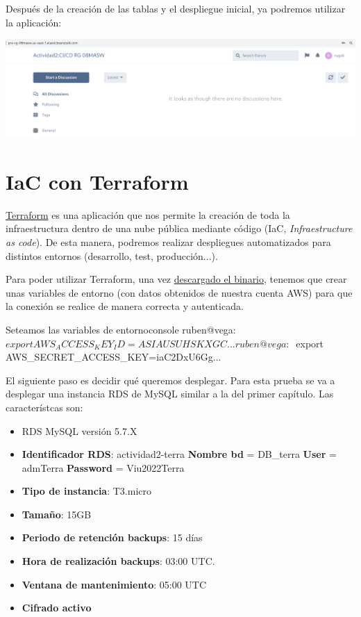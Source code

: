 \documentclass{\ClassPath/viu-tfm-template}
\begin{document}
Después de la creación de las tablas y el despliegue inicial, ya podremos utilizar la aplicación:
\begin{center}
    \includegraphics[frame,width=\linewidth]{img/flarum-3.png}
\end{center}

\chapter{IaC con Terraform}
\href{https://www.terraform.io/}{Terraform} es una aplicación que nos permite  la creación de toda la infraestructura dentro de una nube pública mediante código (IaC, \textit{Infraestructure as code}). De esta manera, podremos realizar despliegues automatizados para distintos entornos (desarrollo, test, producción...).

Para poder utilizar Terraform, una vez \href{https://developer.hashicorp.com/terraform/downloads}{descargado el binario}, tenemos que crear unas variables de entorno (con datos obtenidos de nuestra cuenta AWS) para que la conexión se realice de manera correcta y autenticada.

\begin{mycode}{Seteamos las variables de entorno}{console}{}
ruben@vega:~$ export AWS_ACCESS_KEY_ID=ASIAUSUHSKXGC...
ruben@vega:~$ export AWS_SECRET_ACCESS_KEY=iaC2DxU6Gg...
\end{mycode}

El siguiente paso es decidir qué queremos desplegar. Para esta prueba se va a desplegar una instancia RDS de MySQL similar a la del primer capítulo. Las característcas son:

\begin{itemize}
    \item RDS MySQL versión 5.7.X
    \item \textbf{Identificador RDS}: actividad2-terra
    \textbf{Nombre bd} = DB\_terra
    \textbf{User} = admTerra
    \textbf{Password} = Viu2022Terra
    \item \textbf{Tipo de instancia}: T3.micro
    \item \textbf{Tamaño}: 15GB
    \item \textbf{Periodo de retención backups}: 15 días
    \item \textbf{Hora de realización backups}: 03:00 UTC.
    \item \textbf{Ventana de mantenimiento}: 05:00 UTC
    \item \textbf{Cifrado activo}
\end{itemize}
\end{document}
